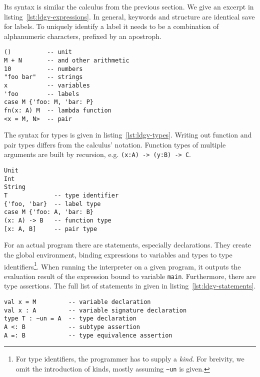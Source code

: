 Its syntax is similar the calculus from the previous section. We give an excerpt in listing~\ref{lst:ldgv-expressions}. In general, keywords and structure are identical save for labels. To uniquely identify a label it needs to be a combination of alphanumeric characters, prefixed by an apostroph.

\begin{lstlisting}[float,language=ldgv,
  caption={Expressions in LDGV (excerpt) with expressions \texttt{M,N,P}, variable \texttt{x} and type \texttt{A}},
  label=lst:ldgv-expressions]
()          -- unit
M + N       -- and other arithmetic
10          -- numbers
"foo bar"   -- strings
x           -- variables
'foo        -- labels
case M {'foo: M, 'bar: P}
fn(x: A) M  -- lambda function
<x = M, N>  -- pair
\end{lstlisting}

The syntax for types is given in listing~\ref{lst:ldgv-types}. Writing out function and pair types differs from the calculus' notation. Function types of multiple arguments are built by recursion, e.g. \texttt{(x:A) -> (y:B) -> C}.

\begin{lstlisting}[float,language=ldgv,
  caption={Types in LDGV (excerpt) with expression \texttt{M}, variable \texttt{x}, type identifier \texttt{T} and types \texttt{A,B}},
  label=lst:ldgv-types]
Unit
Int
String
T             -- type identifier
{'foo, 'bar}  -- label type
case M {'foo: A, 'bar: B}
(x: A) -> B   -- function type
[x: A, B]     -- pair type
\end{lstlisting}

For an actual program there are statements, especially declarations. They create the global environment, binding expressions to variables and types to type identifiers\footnote{For type identifiers, the programmer has to supply a \emph{kind}. For breivity, we omit the introduction of kinds, mostly assuming \texttt{\textasciitilde un} is given.}. When running the interpreter on a given program, it outputs the evaluation result of the expression bound to variable \texttt{main}. Furthermore, there are type assertions. The full list of statements in given in listing~\ref{lst:ldgv-statements}.

\begin{lstlisting}[float,language=ldgv,
  caption={Statements in LDGV, with expression \texttt{M} and types \texttt{A,B}},
  label=lst:ldgv-statements]
val x = M         -- variable declaration
val x : A         -- variable signature declaration
type T : ~un = A  -- type declaration
A <: B            -- subtype assertion
A =: B            -- type equivalence assertion
\end{lstlisting}

